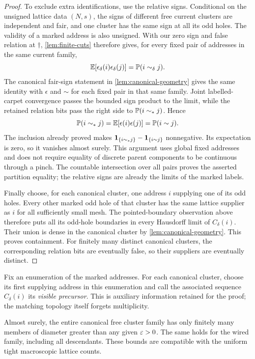 \begin{proof}
To exclude extra identifications, use the relative signs. Conditional
on the unsigned lattice data \((N,s)\), the signs of different free
current clusters are independent and fair, and one cluster has the
same sign at all its odd holes. The validity of a marked address is
also unsigned. With our zero sign and false relation at \(\dagger\),
\cref{lem:finite-cuts} therefore gives, for every fixed pair of
addresses in the same current family,
\begin{equation}
 \E[\epsilon_\delta(i)\epsilon_\delta(j)]
       =\P(i\sim_\delta j).
 \label{eq:partition-sign-discrete}
\end{equation}
The canonical fair-sign statement in \cref{lem:canonical-geometry}
gives the same identity with \(\epsilon\) and \(\sim\) for each fixed
pair in that same family. Joint
labelled-carpet convergence passes the bounded sign product to the
limit, while the retained relation bits pass the right side to
\(\P(i\sim_*j)\). Hence
\[
 \P(i\sim_*j)=\E[\epsilon(i)\epsilon(j)]=\P(i\sim j).
\]
The inclusion already proved makes
\(\ind_{\{i\sim_*j\}}-\ind_{\{i\sim j\}}\) nonnegative. Its
expectation is zero, so it vanishes almost surely. This argument
uses global fixed addresses and does not require equality of
discrete parent components to be continuous through a pinch.
The countable intersection over all pairs proves the asserted
partition equality; the relative signs are already the limits
of the marked labels.

Finally choose, for each canonical cluster, one address \(i\)
supplying one of its odd holes. Every other marked odd hole of
that cluster has the same lattice supplier as \(i\) for all
sufficiently small mesh. The pointed-boundary observation above
therefore puts all its odd-hole boundaries in every Hausdorff
limit of \(C_\delta(i)\). Their union is dense in the canonical
cluster by \cref{lem:canonical-geometry}. This proves containment.
For finitely many distinct canonical clusters, the corresponding
relation bits are eventually false, so their suppliers are
eventually distinct.
\end{proof}

Fix an enumeration of the marked addresses. For each canonical cluster,
choose its first supplying address in this enumeration and call the
associated sequence \(C_\delta(i)\) its \emph{visible precursor}.
This is auxiliary information retained for the proof; the matching
topology itself forgets multiplicity.

\begin{corollary}
\label{cor:canonical-local-finiteness}
Almost surely, the entire canonical free cluster family has only
finitely many members of diameter greater than any given
$\eps>0$. The same holds for the wired family, including all
descendants. These bounds are compatible with the uniform tight
macroscopic lattice counts.
\end{corollary}

